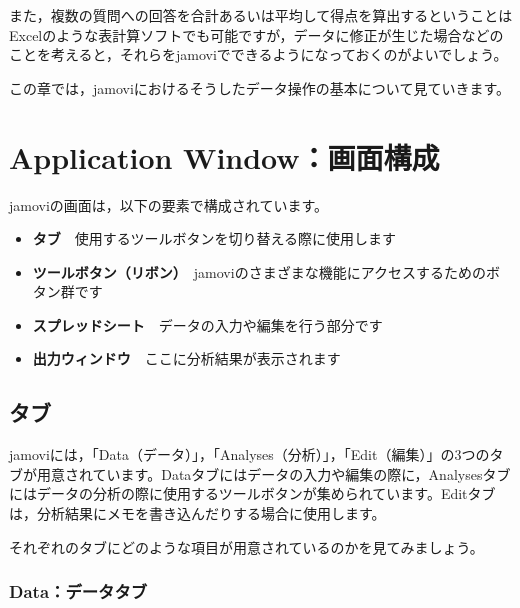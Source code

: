 \documentclass[
  12pt,
  a5jpaper,
  lualatex, ja=standard]{bxjsbook}
\providecommand{\tightlist}{%
  \setlength{\itemsep}{0pt}\setlength{\parskip}{0pt}}
\newenvironment{jmvblue}{%
	\begin{center}%
	\begin{tcolorbox}[%
		colframe=ao,
		colbacktitle=ao,
		colback=ao!2!white,
		breakable,
		width=.9\textwidth,
		]\small\addtolength{\leftmargini}{-3\labelsep}%
	}%
	{\end{tcolorbox}\end{center}}
\begin{document}
また，複数の質問への回答を合計あるいは平均して得点を算出するということはExcelのような表計算ソフトでも可能ですが，データに修正が生じた場合などのことを考えると，それらをjamoviでできるようになっておくのがよいでしょう。

この章では，jamoviにおけるそうしたデータ操作の基本について見ていきます。

\hypertarget{sec:components}{%
\section{Application Window：画面構成}\label{sec:components}}

jamoviの画面は，以下の要素で構成されています。

\begin{jmvblue}

\begin{itemize}
\tightlist
\item
  \textbf{タブ}　使用するツールボタンを切り替える際に使用します
\item
  \textbf{ツールボタン（リボン）}　jamoviのさまざまな機能にアクセスするためのボタン群です
\item
  \textbf{スプレッドシート}　データの入力や編集を行う部分です
\item
  \textbf{出力ウィンドウ}　ここに分析結果が表示されます
\end{itemize}

\end{jmvblue}

\hypertarget{subsec:tabs}{%
\subsection{タブ}\label{subsec:tabs}}

jamoviには，「Data（データ）」，「Analyses（分析）」，「Edit（編集）」の3つのタブが用意されています。Dataタブにはデータの入力や編集の際に，Analysesタブにはデータの分析の際に使用するツールボタンが集められています。Editタブは，分析結果にメモを書き込んだりする場合に使用します。

それぞれのタブにどのような項目が用意されているのかを見てみましょう。

\hypertarget{subsubsec:data-tab}{%
\subsubsection*{Data：データタブ}\label{subsubsec:data-tab}}
\end{document}
